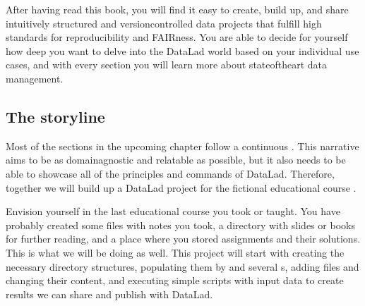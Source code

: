 \sphinxAtStartPar
After having read this book, you will find it easy to create, build up, and
share intuitively structured and version\sphinxhyphen{}controlled data projects that
fulfill high standards for reproducibility and FAIRness. You are able to
decide for yourself how deep you want to delve into the DataLad world
based on your individual use cases, and with every section you will learn
more about state\sphinxhyphen{}of\sphinxhyphen{}the\sphinxhyphen{}art data management.


\subsection{The storyline}
\label{\detokenize{intro/narrative:the-storyline}}
\sphinxAtStartPar
Most of the sections in the upcoming chapter follow a continuous .
This narrative aims to be as domain\sphinxhyphen{}agnostic and relatable as possible, but
it also needs to be able to showcase all of the principles and commands
of DataLad. Therefore, together we will build up a DataLad project for the
fictional educational course .

\sphinxAtStartPar
Envision yourself in the last educational course you took or taught.
You have probably created some files with notes you took, a directory
with slides or books for further reading, and a place where you stored
assignments and their solutions. This is what we will be doing as well.
This project will start with creating the necessary directory structures,
populating them by  and  several
{\hyperref[\detokenize{glossary:term-DataLad-subdataset}]{}}s, adding files and changing their content,
and executing simple scripts with input data to create results we can
share and publish with DataLad.

